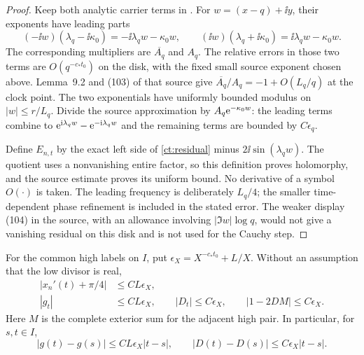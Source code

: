 \begin{proof}
Keep both analytic carrier terms in \cite[\S9, (102)]{Polymath2019DBN}.
For $w=(x-q)+\ii y$, their exponents have leading parts
\[
 (-\ii w)(\lambda_q-\ii\kappa_0)
       =-\ii\lambda_qw-\kappa_0w,
 \qquad
 (\ii w)(\lambda_q+\ii\kappa_0)
       =\ii\lambda_qw-\kappa_0w.
\]
The corresponding multipliers are $\overline{A_q}$ and $A_q$.
The relative errors in those two terms are $O(q^{-c_*t_0})$ on the
disk, with the fixed small source exponent chosen above.
Lemma~9.2 and (103) of that source give
$\overline{A_q}/A_q=-1+O(L_q/q)$ at the clock point.
The two exponentials have uniformly bounded modulus on
$|w|\le r/L_q$. Divide the source approximation by
$A_q\mathrm e^{-\kappa_0w}$: the leading terms combine to
$\mathrm e^{\mathrm i\lambda_qw}-\mathrm e^{-\mathrm i\lambda_qw}$ and the remaining
terms are bounded by $C\epsilon_q$.

Define $E_{n,t}$ by the exact left side of \eqref{ct:residual}
minus $2\ii\sin(\lambda_qw)$. The quotient uses a nonvanishing
entire factor, so this definition proves holomorphy, and the source
estimate proves its uniform bound. No derivative of a symbol $O(\cdot)$
is taken. The leading frequency is deliberately $L_q/4$; the smaller
time-dependent phase refinement is included in the stated error.
The weaker display (104) in the source, with an allowance involving
$|\Im w|\log q$, would not give a vanishing residual on this disk
and is not used for the Cauchy step.
\end{proof}

\begin{proposition}
\label{ct:velocity}
For the common high labels on $I$, put
$\epsilon_X=X^{-c_*t_0}+L/X$. Without an assumption that the low
divisor is real,
\begin{equation}
 \begin{split}
 |x_n'(t)+\pi/4|&\le C L\epsilon_X,\\
 |g_t|&\le C L\epsilon_X,\qquad
 |D_t|\le C\epsilon_X,\qquad
 |1-2DM|\le C\epsilon_X.
 \end{split}
 \label{ct:velocity-bounds}
\end{equation}
Here $M$ is the complete exterior sum for the adjacent high pair.
In particular, for $s,t\in I$,
\begin{equation}
 |g(t)-g(s)|\le C L\epsilon_X|t-s|,
 \qquad |D(t)-D(s)|\le C\epsilon_X|t-s|.
 \label{ct:integrated-jets}
\end{equation}
\end{proposition}

